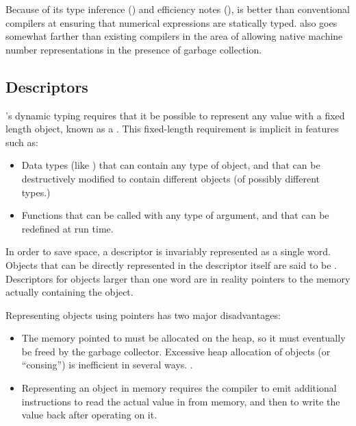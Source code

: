 Because of its type inference () and efficiency
notes (), \python{} is better than
conventional \llisp{} compilers at ensuring that numerical expressions
are statically typed.  \python{} also goes somewhat farther than existing
compilers in the area of allowing native machine number
representations in the presence of garbage collection.


\subsection{Descriptors}

\llisp{}'s dynamic typing requires that it be possible to represent
any value with a fixed length object, known as a .
This fixed-length requirement is implicit in features such as:
\begin{itemize}
  
\item Data types (like ) that can contain any type
  of object, and that can be destructively modified to contain
  different objects (of possibly different types.)
  
\item Functions that can be called with any type of argument, and that
  can be redefined at run time.
\end{itemize}

In order to save space, a descriptor is invariably represented as a
single word.  Objects that can be directly represented in the
descriptor itself are said to be .  Descriptors for
objects larger than one word are in reality pointers to the memory
actually containing the object.

Representing objects using pointers has two major disadvantages:
\begin{itemize}
  
\item The memory pointed to must be allocated on the heap, so it must
  eventually be freed by the garbage collector.  Excessive heap
  allocation of objects (or ``consing'') is inefficient in several
  ways.  .
  
\item Representing an object in memory requires the compiler to emit
  additional instructions to read the actual value in from memory, and
  then to write the value back after operating on it.
\end{itemize}

